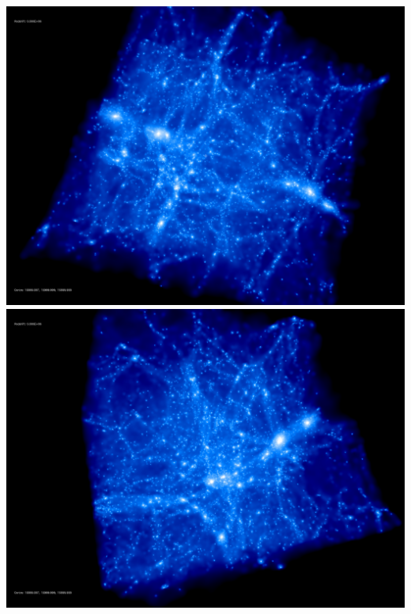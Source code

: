 \includegraphics[scale=0.1]{stages_13/rotate_00074.jpg} 
\includegraphics[scale=0.1]{stages_13/rotate_00131.jpg}

